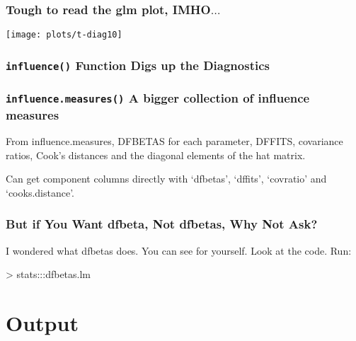 \documentclass[10pt,english]{beamer}
\begin{document}
\begin{frame}[plain]
  \frametitle{Tough to read the glm plot, IMHO$\ldots$}

\texttt{[image: plots/t-diag10]}

\end{frame}




\begin{frame}
   \frametitle{\texttt{influence()} Function Digs up the Diagnostics}


\end{frame}

\begin{frame}
 \frametitle{\texttt{influence.measures()} A bigger collection of influence measures}

 From influence.measures, DFBETAS for each parameter, DFFITS, covariance ratios, Cook's distances and the diagonal elements of the hat matrix.




     Can get component columns directly with ‘dfbetas’, ‘dffits’, ‘covratio’ and ‘cooks.distance’.
\end{frame}




\begin{frame}
 \frametitle{But if You Want dfbeta, Not dfbetas, Why Not Ask?}




      I wondered what dfbetas does. You can see for yourself. Look at
      the code. Run:

\begin{Schunk}\begin{Soutput}
    >  stats:::dfbetas.lm
  \end{Soutput}
\end{Schunk}

\end{frame}





\section{Output}
\end{document}
